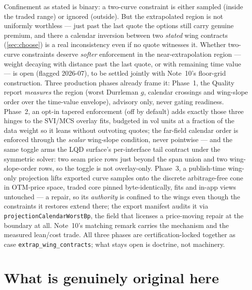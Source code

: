 \documentclass[11pt]{article}
\begin{document}
\begin{remark}
\label{rem:softwings}
Confinement as stated is binary: a two-curve constraint is either
sampled (inside the traded range) or ignored (outside).  But the
extrapolated region is not uniformly worthless --- just past the last
quote the options still carry genuine premium, and there a calendar
inversion between two \emph{stated} wing contracts (\cref{sec:choose})
is a real inconsistency even if no quote witnesses it.  Whether
two-curve constraints deserve \emph{softer} enforcement in the
near-extrapolation region --- weight decaying with distance past the
last quote, or with remaining time value --- is open (flagged 2026-07),
to be settled jointly with Note~10's floor-grid construction.  Three
production phases already frame it: Phase~1, the Quality report
\emph{measures} the region (worst Durrleman $g$, calendar crossings and
wing-slope order over the time-value envelope), advisory only, never
gating readiness.  Phase~2, an opt-in tapered enforcement (off by
default) adds exactly those three hinges to the SVI/MCS overlay fits,
budgeted in vol units at a fraction of the data weight so it leans
without outvoting quotes; the far-field calendar order is enforced
through the \emph{scalar} wing-slope condition, never pointwise --- and
the same toggle arms the LQD surface's per-interface tail contract under
the symmetric solver: two seam price rows just beyond the span union and
two wing-slope-order rows, so the toggle is not overlay-only.
Phase~3, a publish-time wing-only projection lifts exported curve
samples onto the discrete arbitrage-free cone in OTM-price space, traded
core pinned byte-identically, fits and in-app views untouched --- a
repair, so its \emph{authority} is confined to the wings even though the
constraints it restores extend there; the export manifest audits it via
\texttt{projectionCalendarWorstBp}, the field that licenses a
price-moving repair at the boundary at all.  Note~10's matching remark
carries the mechanism and the measured lean/cost trade.  All three
phases are certification-locked together as case
\texttt{extrap\_wing\_contracts}; what stays open is doctrine, not
machinery.
\end{remark}

\section{What is genuinely original here}
\label{sec:original}
\end{document}
